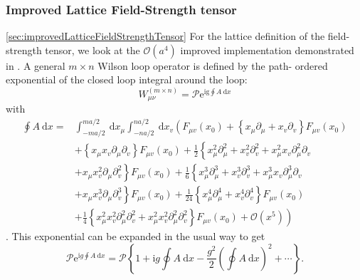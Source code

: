 \documentclass[a4paper,10pt]{article}
\begin{document}
\subsubsection{Improved Lattice Field-Strength tensor}\ref{sec:improvedLatticeFieldStrengthTensor}
For the lattice definition of the field- strength tensor, we look at the $\mathcal{O}\left(a^{4}\right)$ improved implementation demonstrated in \cite{BILSONTHOMPSON20031}. A general $m\times n$ Wilson loop operator is defined by the path- ordered exponential of the closed loop integral around the loop:
\begin{equation}
W_{\mu \nu}^{(m \times n)}=\mathscr{P} \mathrm{e}^{\mathrm{ig} \oint A \mathrm{~d} x}
\end{equation}
with 
\begin{equation}\label{eq:WilsonLoopExpansionLoopIntegral}
\begin{aligned}
\oint A \mathrm{~d} x=& \int_{-m a / 2}^{m a / 2} \mathrm{~d} x_{\mu} \int_{-n a / 2}^{n a / 2} \mathrm{~d} x_{v}\left(F_{\mu v}\left(x_{0}\right)+\left\{x_{\mu} \partial_{\mu}+x_{v} \partial_{v}\right\} F_{\mu v}\left(x_{0}\right)\right.\\
&+\left\{x_{\mu} x_{v} \partial_{\mu} \partial_{v}\right\} F_{\mu v}\left(x_{0}\right)+\frac{1}{2}\left\{x_{\mu}^{2} \partial_{\mu}^{2}+x_{v}^{2} \partial_{v}^{2}+x_{\mu}^{2} x_{v} \partial_{\mu}^{2} \partial_{v}\right.\\
&\left.+x_{\mu} x_{v}^{2} \partial_{\mu} \partial_{v}^{2}\right\} F_{\mu v}\left(x_{0}\right)+\frac{1}{6}\left\{x_{\mu}^{3} \partial_{\mu}^{3}+x_{v}^{3} \partial_{v}^{3}+x_{\mu}^{3} x_{v} \partial_{\mu}^{3} \partial_{v}\right.\\
&\left.+x_{\mu} x_{v}^{3} \partial_{\mu} \partial_{v}^{3}\right\} F_{\mu v}\left(x_{0}\right)+\frac{1}{24}\left\{x_{\mu}^{4} \partial_{\mu}^{4}+x_{v}^{4} \partial_{v}^{4}\right\} F_{\mu v}\left(x_{0}\right) \\
&\left.+\frac{1}{4}\left\{x_{\mu}^{2} x_{v}^{2} \partial_{\mu}^{2} \partial_{v}^{2}+x_{\mu}^{2} x_{v}^{2} \partial_{\mu}^{2} \partial_{v}^{2}\right\} F_{\mu v}\left(x_{0}\right)+\mathcal{O}\left(x^{5}\right)\right) 
\end{aligned}
\end{equation}
\cite{BILSONTHOMPSON20031}. This exponential can be expanded in the usual way to get 
\begin{equation}
\mathscr{P} \mathrm{e}^{\mathrm{i} g \oint A \mathrm{~d} x}=\mathscr{P}\left\{1+\mathrm{i} g \oint A \mathrm{~d} x-\frac{g^{2}}{2}(\oint A \mathrm{~d} x)^{2}+\cdots\right\}.
\end{equation}
\end{document}
